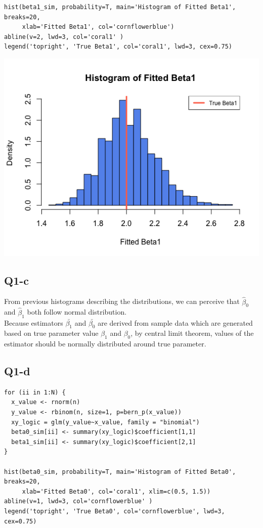 \documentclass[12pt,letterpaper]{article}
\let\hat\widehat
\begin{document}
\begin{verbatim}
hist(beta1_sim, probability=T, main='Histogram of Fitted Beta1', breaks=20,
     xlab='Fitted Beta1', col='cornflowerblue')
abline(v=2, lwd=3, col='coral1' )
legend('topright', 'True Beta1', col='coral1', lwd=3, cex=0.75)
\end{verbatim}

\includegraphics[width=150mm]{hist_beta1.png}

\subsection*{Q1-c}
\noindent From previous histograms describing the distributions, we can perceive that $\hat{\beta}_0$ and $\hat{\beta}_1$ both follow normal distribution. \\

\noindent Because estimators $\bar{\beta_1}$ and $\bar{\beta_0}$ are derived from sample data which are generated based on true parameter value $\beta_1$ and $\beta_0$, by central limit theorem, values of the estimator should be normally distributed around true parameter. 

\newpage
\subsection*{Q1-d}
\begin{verbatim}
for (ii in 1:N) {
  x_value <- rnorm(n)
  y_value <- rbinom(n, size=1, p=bern_p(x_value))
  xy_logic = glm(y_value~x_value, family = "binomial")
  beta0_sim[ii] <- summary(xy_logic)$coefficient[1,1]
  beta1_sim[ii] <- summary(xy_logic)$coefficient[2,1]
}

hist(beta0_sim, probability=T, main='Histogram of Fitted Beta0', breaks=20,
     xlab='Fitted Beta0', col='coral1', xlim=c(0.5, 1.5))
abline(v=1, lwd=3, col='cornflowerblue' )
legend('topright', 'True Beta0', col='cornflowerblue', lwd=3, cex=0.75)
\end{verbatim}
\end{document}
